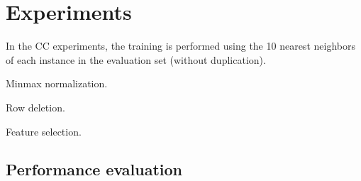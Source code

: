 \documentclass{sig-alternate}
\begin{document}
\section{Experiments}
In the CC experiments, the training is performed using the 10 nearest neighbors of each instance in the 
evaluation set (without duplication). 

Minmax normalization.

Row deletion.

Feature selection.

\subsection{Performance evaluation}




%
%
\appendix
\end{document}
